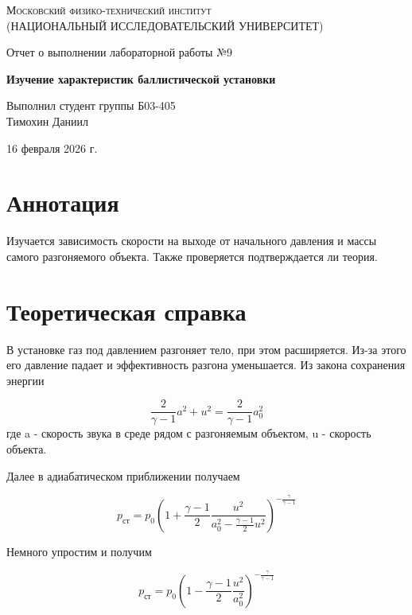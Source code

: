 \documentclass[12pt,a4paper]{article}
\def \TITLE {Отчет о выполнении лабораторной работы №9}
\def \SUBTITLE {Изучение характеристик баллистической установки}
\def \AUTHOR {Выполнил студент группы Б03-405\\ Тимохин Даниил}
\def \DATE {16 февраля 2026 г.}
\begin{document}
\begin{titlepage}
	\centering
	\vspace{5cm}
	{\scshape\large Московский физико-технический институт \\
	(НАЦИОНАЛЬНЫЙ ИССЛЕДОВАТЕЛЬСКИЙ УНИВЕРСИТЕТ)}
	
	\vspace{4cm}
	{\LARGE \TITLE}
	
	\vspace{1cm}
	{\Huge\bf \SUBTITLE }
	
	\vspace{1cm}
	\vfill
	
\begin{flushright}
	{\LARGE \AUTHOR}
\end{flushright}
	

	\vfill

	\DATE
\end{titlepage}

\newpage

\fontsize{12}{14}\selectfont

\section{ Аннотация}
Изучается зависимость скорости на выходе от начального давления и массы самого разгоняемого объекта. Также проверяется подтверждается ли теория.


\section{ Теоретическая справка}
В установке газ под давлением разгоняет тело, при этом расширяется. Из-за этого его давление падает и эффективность разгона уменьшается. Из закона сохранения энергии 

\begin{equation}
    \frac{2}{\gamma-1}a^2+u^2=\frac{2}{\gamma-1}a_0^2
\end{equation}
где a - скорость звука в среде рядом с разгоняемым объектом, u - скорость объекта.

Далее в адиабатическом приближении получаем

\begin{equation}
    p_{ст}=p_0\left( 1+ \frac{\gamma-1}{2}\frac{u^2}{a_0^2-\frac{\gamma-1}{2}u^2} \right)^{-\frac{\gamma}{\gamma-1}}
\end{equation}

Немного упростим и получим

\begin{equation}
    p_{ст}=p_0\left( 1 - \frac{\gamma-1}{2}\frac{u^2}{a_0^2} \right)^{-\frac{\gamma}{\gamma-1}}
\end{equation}
\end{document}

